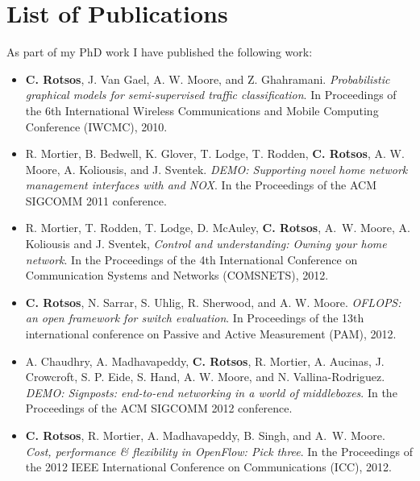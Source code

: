 \chapter*{List of Publications}

As part of my PhD work I have published the following work:

\begin{itemize}
  \item \textbf{C. Rotsos}, J. Van Gael, A. W. Moore, and Z.  Ghahramani.
        \textit{Probabilistic graphical models for semi-supervised traffic
          classification}. In Proceedings of the 6th International Wireless
        Communications and Mobile Computing Conference (IWCMC), 2010.

  \item R. Mortier, B. Bedwell, K. Glover, T. Lodge, T. Rodden, \textbf{C.
      Rotsos}, A. W. Moore, A. Koliousis, and J. Sventek. \textit{DEMO:
      Supporting novel home network management interfaces with \of and NOX}. In
      the Proceedings of the ACM SIGCOMM 2011 conference.

  \item R. Mortier, T. Rodden, T. Lodge, D. McAuley, \textbf{C. Rotsos}, A.~W.
        Moore, A. Koliousis and J. Sventek, \textit{Control and understanding:
          Owning your home network}. In the Proceedings of the 4th International
        Conference on Communication Systems and Networks (COMSNETS), 2012. 

  \item \textbf{C. Rotsos}, N. Sarrar, S. Uhlig, R. Sherwood,
      and A. W. Moore. \textit{OFLOPS: an open framework for \of
          switch evaluation}. In Proceedings of the 13th international
      conference on Passive and Active Measurement (PAM), 2012. 

  \item A. Chaudhry, A. Madhavapeddy, \textbf{C. Rotsos}, R. Mortier, A.
      Aucinas, J. Crowcroft, S. P. Eide, S. Hand, A. W. Moore, and N.
      Vallina-Rodriguez. \textit{DEMO: Signposts: end-to-end networking in a
      world of middleboxes}. In the Proceedings of the ACM SIGCOMM 2012
      conference.
      \newpage
  \item \textbf{C. Rotsos}, R. Mortier, A. Madhavapeddy, B. Singh, and A.~W.
        Moore.  \textit{Cost, performance \& flexibility in OpenFlow: Pick
          three}. In the Proceedings of the 2012 IEEE International
        Conference on Communications (ICC), 2012. 


\end{itemize}
